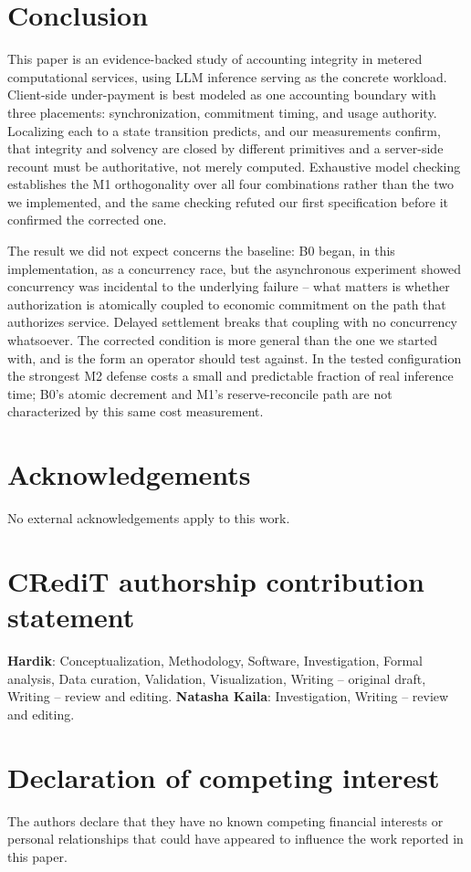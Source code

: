 \documentclass[final,5p,times,twocolumn,number]{elsarticle}
\begin{document}
\section{Conclusion}
This paper is an evidence-backed study of accounting integrity in metered computational
services, using LLM inference serving as the concrete workload. Client-side under-payment
is best modeled as one accounting boundary with three placements: synchronization,
commitment timing, and usage authority. Localizing each to a state transition predicts,
and our measurements confirm, that integrity and solvency are closed by different
primitives and a server-side recount must be authoritative, not merely computed.
Exhaustive model checking establishes
the M1 orthogonality over all four combinations rather than the two we implemented, and
the same checking refuted our first specification before it confirmed the corrected one.

The result we did not expect concerns the baseline: B0 began, in this implementation, as
a concurrency race, but the asynchronous experiment showed concurrency was incidental to
the underlying failure -- what matters is whether authorization is atomically coupled to
economic commitment on the path that authorizes service. Delayed settlement breaks that
coupling with no concurrency whatsoever. The corrected condition is more general than the
one we started with, and is the form an operator should test against. In the tested configuration the strongest M2 defense costs a small and
predictable fraction of real inference time; B0's atomic decrement and M1's
reserve-reconcile path are not characterized by this same cost measurement.

\section*{Acknowledgements}
No external acknowledgements apply to this work.

\section*{CRediT authorship contribution statement}
\textbf{Hardik}: Conceptualization, Methodology, Software, Investigation, Formal
analysis, Data curation, Validation, Visualization, Writing -- original draft, Writing --
review and editing. \textbf{Natasha Kaila}: Investigation, Writing -- review and editing.

\section*{Declaration of competing interest}
The authors declare that they have no known competing financial interests or personal
relationships that could have appeared to influence the work reported in this paper.
\end{document}
